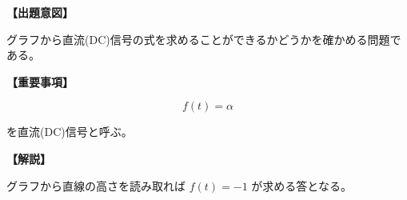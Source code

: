 \noindent \textbf{【出題意図】}

\noindent グラフから直流(DC)信号の式を求めることができるかどうかを確かめる問題である。

\vspace{1em}
\noindent \textbf{【重要事項】}

\[
f(t) = \alpha
\]

\medskip
\noindent を直流(DC)信号と呼ぶ。


\vspace{1em}
\noindent \textbf{【解説】}

\noindent グラフから直線の高さを読み取れば $f(t) = -1$ が求める答となる。

